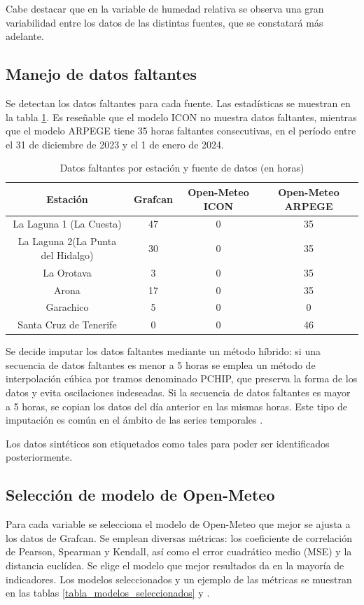 Cabe destacar que en la variable de humedad relativa se observa una gran variabilidad entre los datos de las distintas fuentes, que se constatará más adelante.

\subsection{Manejo de datos faltantes}
Se detectan los datos faltantes para cada fuente. Las estadísticas se muestran en la tabla \ref{tabla_datos_faltantes}. 
Es reseñable que el modelo ICON no muestra datos faltantes, mientras que el modelo ARPEGE tiene 35 horas faltantes consecutivas, en el período entre el 31 de diciembre de 2023 y el 1 de enero de 2024.

\begin{table}[htb]
    \small
    \centering
    \begin{tabular}{|c|c|c|c|}
        \hline
        Estación & Grafcan & Open-Meteo ICON & Open-Meteo ARPEGE \\
        \hline
        La Laguna 1 (La Cuesta) & 47 & 0 & 35 \\
        La Laguna 2(La Punta del Hidalgo) & 30 & 0 & 35 \\
        La Orotava & 3 & 0 & 35 \\
        Arona & 17 & 0 & 35 \\
        Garachico & 5 & 0 & 0 \\
        Santa Cruz de Tenerife & 0 & 0 & 46 \\
        \hline
    \end{tabular}
    \caption{Datos faltantes por estación y fuente de datos (en horas)}
    \label{tabla_datos_faltantes} 
\end{table}

Se decide imputar los datos faltantes mediante un método híbrido: si una secuencia de datos faltantes es menor a 5 horas se emplea 
un método de interpolación cúbica por tramos denominado PCHIP\cite{fritsch1980}, que preserva la forma de los datos y evita oscilaciones indeseadas.
Si la secuencia de datos faltantes es mayor a 5 horas, se copian los datos del día anterior en las mismas horas. 
Este tipo de imputación es común en el ámbito de las series temporales \cite{tawakuli2024}.

Los datos sintéticos son etiquetados como tales para poder ser identificados posteriormente.


\subsection{Selección de modelo de Open-Meteo}
Para cada variable se selecciona el modelo de Open-Meteo que mejor se ajusta a los datos de Grafcan.
Se emplean diversas métricas: los coeficiente de correlación de Pearson, Spearman y Kendall, así como el error cuadrático medio (MSE) y 
la distancia euclídea. Se elige el modelo que mejor resultados da en la mayoría de indicadores. Los modelos seleccionados y un ejemplo de las métricas
 se muestran en las tablas \ref{tabla_modelos_seleccionados} y .

